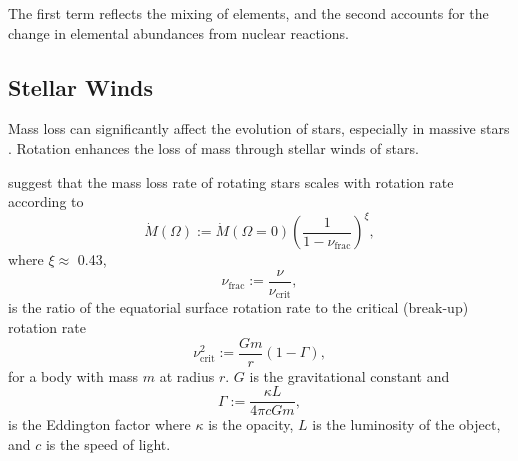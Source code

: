 The first term reflects the mixing of elements, and the second accounts for the change in elemental abundances from nuclear reactions.

\subsection{Stellar Winds}

Mass loss can significantly affect the evolution of stars, especially in massive stars \citep{chiosi_1986}.
Rotation enhances the loss of mass through stellar winds of stars.


\citet{friend_theory_1986, langer_evolution_1991, heger_presupernova_1998} suggest that the mass loss rate of rotating stars scales with rotation rate according to
\begin{equation}
    \Dot{M}(\Omega) := \Dot{M}(\Omega = 0) \left( \frac{1}{1- \nu_{\text{frac}}}\right)^{\xi},
\end{equation}
where $\xi \approx$ 0.43,
\begin{equation}
    \nu_{\text{frac}} := \frac{\nu}{\nu_{\text{crit}}},
\end{equation}
is the ratio of the equatorial surface rotation rate to the critical (break-up) rotation rate
\begin{equation}
    \nu_{\text{crit}}^2 := \frac{G m}{r} \left(1 - \Gamma\right),
\end{equation}
for a body with mass $m$ at radius $r$. $G$ is the gravitational constant and 
\begin{equation}
    \Gamma := \frac{\kappa L}{4 \pi c G m},
\end{equation}
is the Eddington factor where $\kappa$ is the opacity, $L$ is the luminosity of the object, and $c$ is the speed of light.

